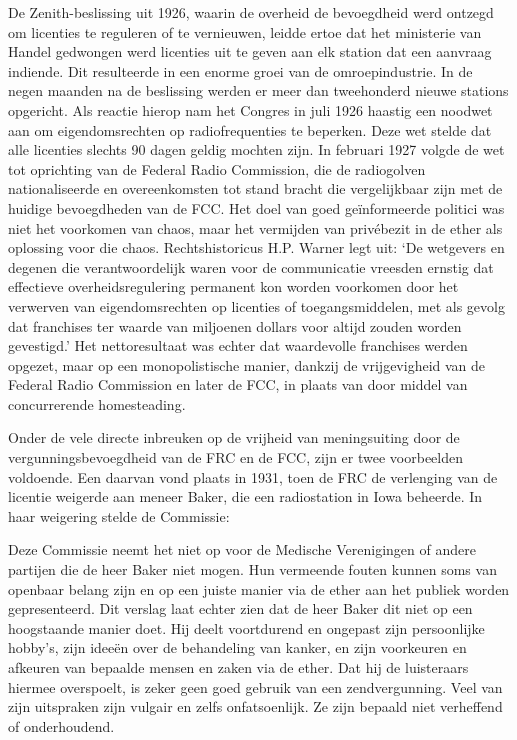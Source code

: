 \documentclass[
  a5paper,
  smalldemyvopaper,10pt,twoside,onecolumn,openright,extrafontsizes,hidelinks]{memoir}
\renewenvironment{quote}%
               {\list{}{\rightmargin=.6cm\leftmargin=.6cm}%
                \itshape \item[]}%
               {\endlist}
\begin{document}
De Zenith-beslissing uit 1926, waarin de overheid de bevoegdheid werd
ontzegd om licenties te reguleren of te vernieuwen, leidde ertoe dat het
ministerie van Handel gedwongen werd licenties uit te geven aan elk
station dat een aanvraag indiende. Dit resulteerde in een enorme groei
van de omroepindustrie. In de negen maanden na de beslissing werden er
meer dan tweehonderd nieuwe stations opgericht. Als reactie hierop nam
het Congres in juli 1926 haastig een noodwet aan om eigendomsrechten op
radiofrequenties te beperken. Deze wet stelde dat alle licenties slechts
90 dagen geldig mochten zijn. In februari 1927 volgde de wet tot
oprichting van de Federal Radio Commission, die de radiogolven
nationaliseerde en overeenkomsten tot stand bracht die vergelijkbaar
zijn met de huidige bevoegdheden van de FCC. Het doel van goed
geïnformeerde politici was niet het voorkomen van chaos, maar het
vermijden van privébezit in de ether als oplossing voor die chaos.
Rechtshistoricus H.P. Warner legt uit: `De wetgevers en degenen die
verantwoordelijk waren voor de communicatie vreesden ernstig dat
effectieve overheidsregulering permanent kon worden voorkomen door het
verwerven van eigendomsrechten op licenties of toegangsmiddelen, met als
gevolg dat franchises ter waarde van miljoenen dollars voor altijd
zouden worden gevestigd.' Het nettoresultaat was echter dat waardevolle
franchises werden opgezet, maar op een monopolistische manier, dankzij
de vrijgevigheid van de Federal Radio Commission en later de FCC, in
plaats van door middel van concurrerende homesteading.

Onder de vele directe inbreuken op de vrijheid van meningsuiting door de
vergunningsbevoegdheid van de FRC en de FCC, zijn er twee voorbeelden
voldoende. Een daarvan vond plaats in 1931, toen de FRC de verlenging
van de licentie weigerde aan meneer Baker, die een radiostation in Iowa
beheerde. In haar weigering stelde de Commissie:

\begin{quote}
Deze Commissie neemt het niet op voor de Medische Verenigingen of andere
partijen die de heer Baker niet mogen. Hun vermeende fouten kunnen soms
van openbaar belang zijn en op een juiste manier via de ether aan het
publiek worden gepresenteerd. Dit verslag laat echter zien dat de heer
Baker dit niet op een hoogstaande manier doet. Hij deelt voortdurend en
ongepast zijn persoonlijke hobby's, zijn ideeën over de behandeling van
kanker, en zijn voorkeuren en afkeuren van bepaalde mensen en zaken via
de ether. Dat hij de luisteraars hiermee overspoelt, is zeker geen goed
gebruik van een zendvergunning. Veel van zijn uitspraken zijn vulgair en
zelfs onfatsoenlijk. Ze zijn bepaald niet verheffend of onderhoudend.
\end{quote}
\end{document}
